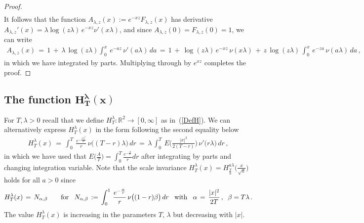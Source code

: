 \documentclass[10pt]{article}
\numberwithin{equation}{section}
\theoremstyle{definition}
\newcommand{\R}{{\mathbb R}}
\begin{document}
\begin{proof}
\begin{align*}
\end{align*}
It follows that the function $A_{\lambda,z}(x):= e^{-xz }F_{\lambda,z}(x)$ has derivative $A_{\lambda,z}'(x)=\lambda \log( z\lambda)\, e^{-xz }\nu'( x\lambda )$, and since $A_{\lambda,z}(0)=F_{\lambda,z}(0)=1$, we can  write
\begin{align*}
A_{\lambda,z}(x)\,=\,1\,+\,\lambda \,\log( z\lambda)\int_0^x \,e^{- az}\,\nu'( a \lambda)\,da  \,=\,1\,+\,\log(z \lambda )\,e^{-x z}\,\nu( x \lambda )\,+\,z\,\log( z \lambda)\,\int_0^x \,e^{- za}\,\nu( a \lambda )\,da\,,
\end{align*}
in which we have integrated by parts.
Multiplying through by $e^{xz}$ completes the proof.
\end{proof}































\subsection{The function $   \boldsymbol{H_{ T}^{\lambda}(x)} $}\label{SubsectHFunct}

For $T,\lambda >0$ recall that we define $H_{T}^{\lambda}: \R^2\rightarrow [0,\infty]$  as in~(\ref{DefH}).   We can alternatively express $H_{T}^{\lambda}(x)$ in the form following the second equality below
\begin{align} \label{Kfun} 
 H_{ T}^{\lambda}(x)\,=\,  \int_{0}^T \,\frac{  e^{-\frac{|x|^2}{2r}}  }{ r  } \,\nu\big((T- r)\lambda\big)\,dr  \,=\,\lambda \,\int_{0}^T \,  E\bigg(\frac{|x|^2}{2(T-r) }\bigg)\,\nu'\big(r\lambda \big)\,dr \,,
\end{align}
in which we have used that $E\big(\frac{A}{T}\big)=\int_0^T \frac{ e^{-\frac{A}{r}}  }{ r  } dr$ after integrating by parts and changing integration variable.  Note that  the   scale invariance $H_{ T}^{\lambda}(x)= H_{\frac{T}{a} }^{a\lambda}\big(\frac{x}{\sqrt{a} }\big)$ holds for all $a>0$  since
\begin{align}\label{H2N}
    H_{ T}^{\lambda}(x) \,=\,N_{\alpha,\beta} \hspace{.7cm}\text{for}\hspace{.3cm} N_{\alpha,\beta} \, := \, \int_{0}^1\, \frac{e^{-\frac{\alpha}{r} }}{r}\, \nu \big( (1-r)\beta \big)\, dr \hspace{.3cm}\text{with} \hspace{.3cm} \alpha\,=\,\frac{|x|^2}{2T}\,, \hspace{.2cm}  \beta=T\lambda\,.
\end{align}
 The value $H_T^{\lambda}(x)$ is increasing in the parameters  $T$, $\lambda$ but decreasing with $|x|$.  
\end{document}
